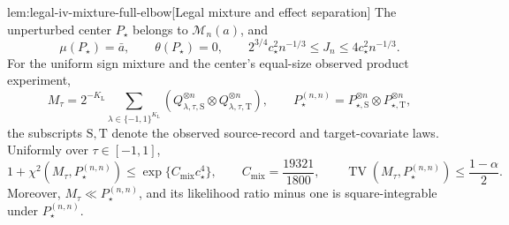 \documentclass[11pt]{article}
\begin{document}
\begin{lemmav}{lem:legal-iv-mixture-full-elbow}[Legal mixture and effect separation]
The unperturbed center \(P_{\star}\) belongs to
\(\mathcal M_n(a)\), and
\[
\mu(P_{\star})=\bar a,
\qquad
\theta(P_{\star})=0,
\qquad
2^{3/4}c_{\star}^2n^{-1/3}
\le J_n\le4c_{\star}^2n^{-1/3}.
\]
For the uniform sign mixture and the center's equal-size observed product experiment,
\[
M_{\tau}
=
2^{-K_{\mathrm L}}
\sum_{\lambda\in\{-1,1\}^{K_{\mathrm L}}}
\left(Q_{\lambda,\tau,\mathrm S}^{\otimes n}
\otimes Q_{\lambda,\tau,\mathrm T}^{\otimes n}\right),
\qquad
P_{\star}^{(n,n)}
=
P_{\star,\mathrm S}^{\otimes n}
\otimes P_{\star,\mathrm T}^{\otimes n},
\]
the subscripts \(\mathrm S,\mathrm T\) denote the observed source-record and target-covariate laws. Uniformly over \(\tau\in[-1,1]\),
\[
1+\chi^2(M_{\tau},P_{\star}^{(n,n)})
\le
\exp\{C_{\mathrm{mix}}c_{\star}^4\},
\qquad
C_{\mathrm{mix}}=\frac{19321}{1800},
\qquad
\operatorname{TV}(M_{\tau},P_{\star}^{(n,n)})
\le\frac{1-\alpha}{2}.
\]
Moreover, \(M_{\tau}\ll P_{\star}^{(n,n)}\), and its likelihood ratio minus one is square-integrable under \(P_{\star}^{(n,n)}\).
\end{lemmav}
\end{document}
